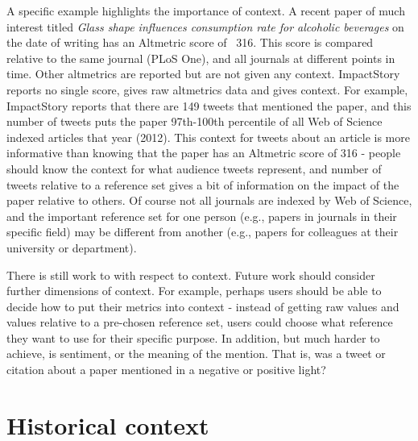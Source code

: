 \documentclass[letterpaper,superscriptaddress,showkeys,longbibliography]{revtex4-1}\usepackage{graphicx, color}
\begin{document}
A specific example highlights the importance of context. A recent paper of much interest titled \emph{Glass shape influences consumption rate for alcoholic beverages} \cite{attwood2012} on the date of writing has an Altmetric score of ~316. This score is compared relative to the same journal (PLoS One), and all journals at different points in time. Other altmetrics are reported but are not given any context. ImpactStory reports no single score, gives raw altmetrics data and gives context. For example, ImpactStory reports that there are 149 tweets that mentioned the paper, and this number of tweets puts the paper 97th-100th percentile of all Web of Science indexed articles that year (2012). This context for tweets about an article is more informative than knowing that the paper has an Altmetric score of 316 - people should know the context for what audience tweets represent, and number of tweets relative to a reference set gives a bit of information on the impact of the paper relative to others. Of course not all journals are indexed by Web of Science, and the important reference set for one person (e.g., papers in journals in their specific field) may be different from another (e.g., papers for colleagues at their university or department). 

There is still work to with respect to context. Future work should consider further dimensions of context. For example, perhaps users should be able to decide how to put their metrics into context - instead of getting raw values and values relative to a pre-chosen reference set, users could choose what reference they want to use for their specific purpose. In addition, but much harder to achieve, is sentiment, or the meaning of the mention. That is, was a tweet or citation about a paper mentioned in a negative or positive light?

\section*{Historical context}
\end{document}
